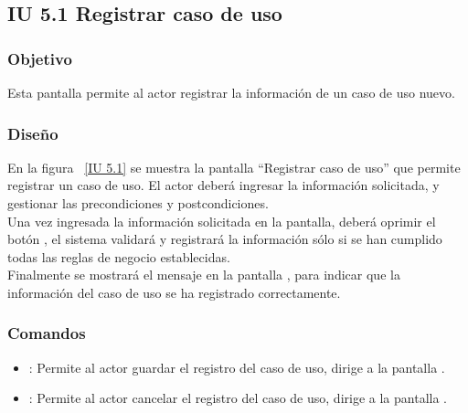 \newpage 
\subsection{IU 5.1 Registrar caso de uso}

\subsubsection{Objetivo}
	
	Esta pantalla permite al actor registrar la información de un caso de uso nuevo.

\subsubsection{Diseño}

    En la figura ~\ref{IU 5.1} se muestra la pantalla ``Registrar caso de uso'' que permite registrar un caso de uso. El actor deberá ingresar la información solicitada, 
    y gestionar las precondiciones y postcondiciones.\\
    
    
    Una vez ingresada la información solicitada en la pantalla, deberá oprimir el botón 
    , el sistema validará y registrará la información sólo si se han cumplido todas las reglas de negocio establecidas.  \\
    
    Finalmente se mostrará el mensaje  en la pantalla , para indicar que la información del caso de uso
    se ha registrado correctamente.        


    


\subsubsection{Comandos}
\begin{itemize}
	\item {}: Permite al actor guardar el registro del caso de uso, dirige a la pantalla .
	\item {}: Permite al actor cancelar el registro del caso de uso, dirige a la pantalla .
\end{itemize}

